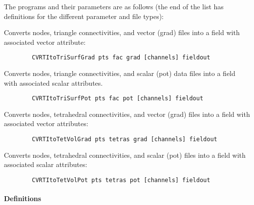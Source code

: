 The programs and their parameters are as follows (the end of the list
has definitions for the different parameter and file types):
%
\begin{description}
   Converts nodes, triangle connectivities, and
        vector (grad) files into a field with associated vector attribute:\\
        \begin{verbatim}
        CVRTItoTriSurfGrad pts fac grad [channels] fieldout
        \end{verbatim}
   Converts nodes, triangle connectivities, and
        scalar (pot) data files into a field with associated scalar
        attributes. 
        \begin{verbatim}
        CVRTItoTriSurfPot pts fac pot [channels] fieldout
        \end{verbatim}
   Converts nodes, tetrahedral connectivities, and
        vector (grad) files into a field with associated vector
        attributes:\\
        \begin{verbatim}
        CVRTItoTetVolGrad pts tetras grad [channels] fieldout
        \end{verbatim}
   Converts nodes, tetrahedral connectivities, and
        scalar (pot) files into a field with associated scalar attributes:\\
        \begin{verbatim}
        CVRTItoTetVolPot pts tetras pot [channels] fieldout
        \end{verbatim}
\end{description}

\paragraph{Definitions}

